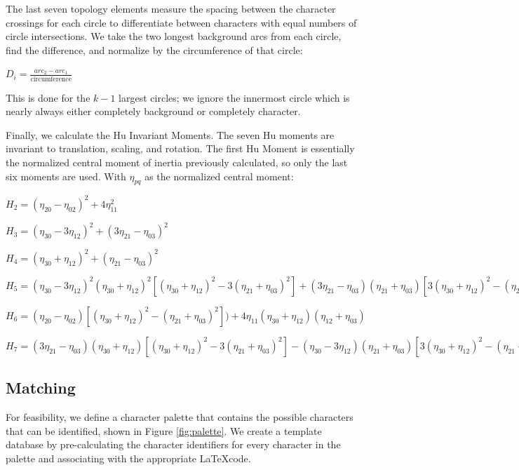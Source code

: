 \documentclass[journal]{IEEEtran}
\begin{document}
The last seven topology elements measure the spacing between the character crossings for each circle to differentiate between characters with equal numbers of circle intersections. We take the two longest background arcs from each circle, find the difference, and normalize by the circumference of that circle:
\begin{center}
    $
    D_i = \frac{arc_2-arc_1}{\text{circumference}}
    $
\end{center}

This is done for the $k-1$ largest circles; we ignore the innermost circle which is nearly always either completely background or completely character.

Finally, we calculate the Hu Invariant Moments\cite{Muralidharan:article_typical}. The seven Hu moments are invariant to translation, scaling, and rotation\cite{Hu:article_typical}. The first Hu Moment is essentially the normalized central moment of inertia previously calculated, so only the last six moments are used. With $\eta_{pq}$ as the normalized central moment:
\begin{center}
    \(H_2=(\eta_{20}-\eta_{02})^2 +4\eta_{11}^2\)
    
    \(H_3=(\eta_{30}-3\eta_{12})^2 +(3\eta_{21}-\eta_{03})^2\)
    
    \(H_4=(\eta_{30}+\eta_{12})^2 +(\eta_{21}-\eta_{03})^2\)
    
    \(H_5=(\eta_{30}-3\eta_{12})^2 (\eta_{30}+\eta_{12})^2[(\eta_{30}+\eta_{12})^2-3(\eta_{21}+\eta_{03})^2]+(3\eta_{21}-\eta_{03})(\eta_{21}+\eta_{03})[3(\eta_{30}+\eta_{12})^2-(\eta_{21}+\eta_{03})^2] \)
    
    \(H_6=(\eta_{20}-\eta_{02})[(\eta_{30}+\eta_{12})^2-(\eta_{21}+\eta_{03})^2])+4\eta_{11}(\eta_{30}+\eta_{12})(\eta_{12}+\eta_{03}) \)
    
    \(H_7=(3\eta_{21}-\eta_{03})(\eta_{30}+\eta_{12})[(\eta_{30}+\eta_{12})^2-3(\eta_{21}+\eta_{03})^2]-(\eta_{30}-3\eta_{12})(\eta_{21}+\eta_{03})[3(\eta_{30}+\eta_{12})^2-(\eta_{21}+\eta_{03})^2]\)
\end{center}

\subsection{Matching}

For feasibility, we define a character palette that contains the possible characters that can be identified, shown in Figure \ref{fig:palette}. We create a template database by pre-calculating the character identifiers for every character in the palette and associating with the appropriate \LaTeX code. 
\end{document}
